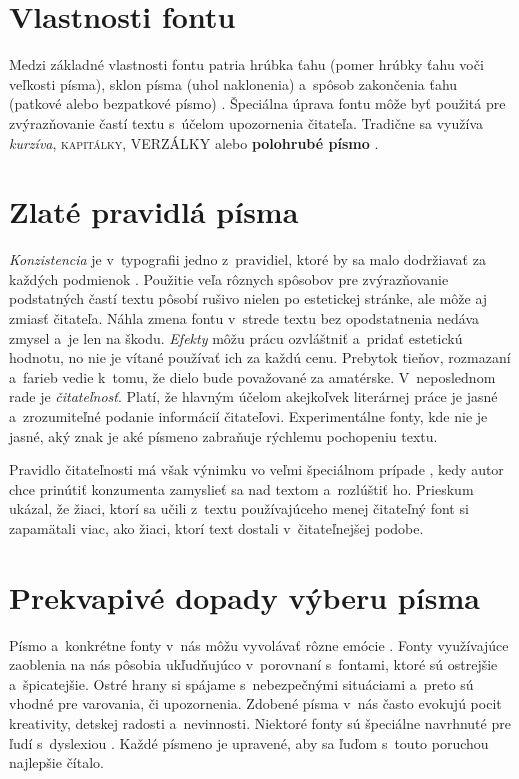 \documentclass[a4paper, 11pt]{article}
\begin{document}
\section{Vlastnosti fontu}
Medzi základné vlastnosti fontu patria hrúbka ťahu (pomer hrúbky ťahu voči veľkosti písma), sklon písma (uhol naklonenia) a~spôsob
zakončenia ťahu (patkové alebo bezpatkové písmo) \cite{Sladovnikova_bakalar}.
Špeciálna úprava fontu môže byť použitá pre zvýrazňovanie častí textu s~účelom upozornenia čitateľa. Tradične sa
využíva \emph{kurzíva}, \textsc{kapitálky}, VERZÁLKY alebo \textbf{polohrubé písmo} \cite{Rybicka_latex}.

\section{Zlaté pravidlá písma}
\emph{Konzistencia} je v~typografii jedno z~pravidiel, ktoré by sa malo dodržiavať za každých podmienok \cite{Twelve_golden_rules}. Použitie veľa rôznych spôsobov pre zvýrazňovanie
podstatných častí textu pôsobí rušivo nielen po estetickej stránke, ale môže aj zmiasť čitateľa. Náhla zmena fontu v~strede textu bez opodstatnenia
nedáva zmysel a~je len na škodu.
\emph{Efekty} môžu prácu ozvláštniť a~pridať estetickú hodnotu, no nie je vítané používať ich za každú cenu. Prebytok
tieňov, rozmazaní a~farieb vedie k~tomu, že dielo bude považované za amatérske. 
V~neposlednom rade je \emph{čitateľnosť}. Platí, že hlavným účelom akejkoľvek literárnej práce je jasné a~zrozumiteľné podanie informácií čitateľovi. Experimentálne fonty, kde nie je jasné, aký znak
je aké písmeno zabraňuje rýchlemu pochopeniu textu.

Pravidlo čitateľnosti má však výnimku vo veľmi špeciálnom prípade \cite{Oppenheimer_hard_fonts}, kedy autor chce prinútiť
konzumenta zamyslieť sa nad textom a~rozlúštiť ho. Prieskum ukázal, že žiaci, ktorí sa učili z~textu používajúceho menej čitateľný font si zapamätali
viac, ako žiaci, ktorí text dostali v~čitateľnejšej podobe.

\section{Prekvapivé dopady výberu písma}
Písmo a~konkrétne fonty v~nás môžu vyvolávať rôzne emócie \cite{Sladovnikova_bakalar}. Fonty využívajúce zaoblenia na nás pôsobia ukľudňujúco v~porovnaní s~fontami, ktoré sú ostrejšie a~špicatejšie. Ostré hrany si spájame s~nebezpečnými situáciami a~preto sú vhodné pre varovania, či upozornenia.
Zdobené písma v~nás často evokujú pocit kreativity, detskej radosti a~nevinnosti. Niektoré fonty sú špeciálne navrhnuté pre ľudí s~dyslexiou \cite{Dyslexie}. Každé písmeno je upravené, aby sa ľuďom s~touto poruchou najlepšie čítalo.  
\end{document}
